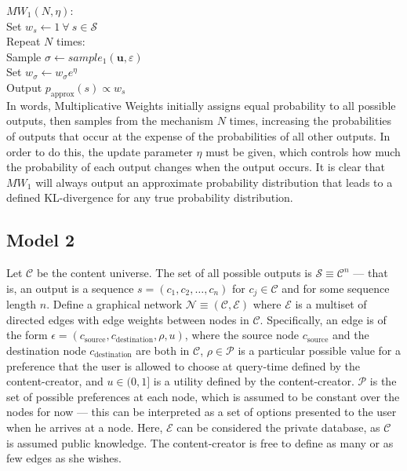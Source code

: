 \documentclass[preprint2]{aastex}
\begin{document}
\noindent \(MW_1(N, \eta):\)\\
\indent Set \(w_s \leftarrow 1 \ \forall \ s \in \mathcal{S}\) \\
\indent Repeat \(N\) times:\\
\indent \indent Sample \(\sigma \leftarrow sample_1(\mathbf{u}, \varepsilon)\) \\
\indent \indent Set \(w_\sigma \leftarrow w_\sigma e^\eta\) \\
\indent Output \(p_\text{approx}(s) \propto w_s \) \\

In words, Multiplicative Weights initially assigns equal probability to all possible outputs, then samples from the mechanism \(N\) times, increasing the probabilities of outputs that occur at the expense of the probabilities of all other outputs. In order to do this, the update parameter \(\eta\) must be given, which controls how much the probability of each output changes when the output occurs. It is clear that \(MW_1\) will always output an approximate probability distribution that leads to a defined KL-divergence for any true probability distribution.

\subsection{Model 2}

Let \(\mathcal{C}\) be the content universe. The set of all possible outputs is \(\mathcal{S} \equiv \mathcal{C}^n\) --- that is, an output is a sequence \(s = (c_1, c_2, \dots, c_n)\) for \(c_j \in \mathcal{C}\) and for some sequence length \(n\). Define a graphical network \(\mathcal{N} \equiv (\mathcal{C}, \mathcal{E})\) where \(\mathcal{E}\) is a multiset of directed edges with edge weights between nodes in \(\mathcal{C}\). Specifically, an edge is of the form \(\epsilon = (c_\text{source}, c_\text{destination}, \rho, u)\), where the source node \(c_\text{source}\) and the destination node \(c_\text{destination}\) are both in \(\mathcal{C}\), \(\rho \in \mathcal{P}\) is a particular possible value for a preference that the user is allowed to choose at query-time defined by the content-creator, and \(u \in (0, 1]\) is a utility defined by the content-creator. \(\mathcal{P}\) is the set of possible preferences at each node, which is assumed to be constant over the nodes for now --- this can be interpreted as a set of options presented to the user when he arrives at a node. Here, \(\mathcal{E}\) can be considered the private database, as \(\mathcal{C}\) is assumed public knowledge. The content-creator is free to define as many or as few edges as she wishes.
\end{document}
